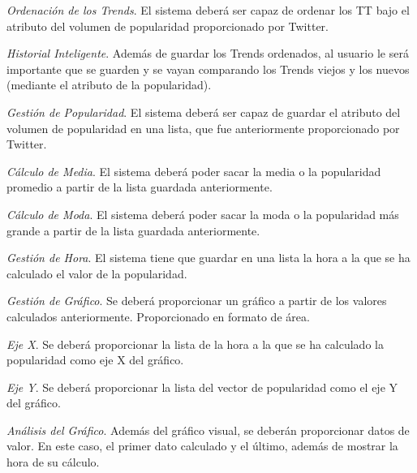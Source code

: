 \begin{enumerate}
{\begin{enumerate}
{        \textit{Ordenación de los Trends}. El sistema deberá ser capaz de ordenar los \ac{TT} bajo el atributo del volumen de popularidad proporcionado por Twitter.
        \item
        \textit{Historial Inteligente}. Además de guardar los Trends ordenados, al usuario le será importante que se guarden y se vayan comparando los Trends viejos y los nuevos (mediante el atributo de la popularidad).
        }\end{enumerate}
    \item
    \textit{Gestión de Popularidad}. El sistema deberá ser capaz de guardar el atributo del volumen de popularidad en una lista, que fue anteriormente proporcionado por Twitter.
    \begin{enumerate}{\renewcommand{\labelenumii}{R.F. \arabic{enumi}.\arabic{enumii}}
        \item
        \textit{Cálculo de Media}. El sistema deberá poder sacar la media o la popularidad promedio a partir de la lista guardada anteriormente.
        \item
        \textit{Cálculo de Moda}. El sistema deberá poder sacar la moda o la popularidad más grande a partir de la lista guardada anteriormente.
        \item
        \textit{Gestión de Hora}. El sistema tiene que guardar en una lista la hora a la que se ha calculado el valor de la popularidad.
        \item
        \textit{Gestión de Gráfico}. Se deberá proporcionar un gráfico a partir de los valores calculados anteriormente. Proporcionado en formato de área.
        \begin{enumerate}{\renewcommand{\labelenumiii}{R.F. \arabic{enumi}.\arabic{enumii}.\arabic{enumiii}}
            \item
            \textit{Eje X}. Se deberá proporcionar la lista de la hora a la que se ha calculado la popularidad como eje X del gráfico.
            \item
            \textit{Eje Y}. Se deberá proporcionar la lista del vector de popularidad como el eje Y del gráfico.
            \item
            \textit{Análisis del Gráfico}. Además del gráfico visual, se deberán proporcionar datos de valor. En este caso, el primer dato calculado y el último, además de mostrar la hora de su cálculo.
            }\end{enumerate}
        }\end{enumerate}
    \item
}
\end{enumerate}
